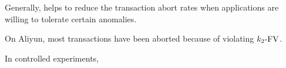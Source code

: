 \begin{frame}{}
  Generally, \rvsi{} helps to reduce the transaction abort rates 
  when applications are willing to tolerate certain anomalies.

  \pause
  \vspace{0.6cm}
  \begin{description}[<+->]
    \setlength{\itemsep}{5pt}
    \item[$\ktwofv$:] On Aliyun, most transactions have been aborted because of violating $\ktwofv$.
    \item[$\konebv$:] In controlled experiments,
    \item[$\kthreesv$:]
  \end{description}
\end{frame}

\begin{frame}{}
\end{frame}
